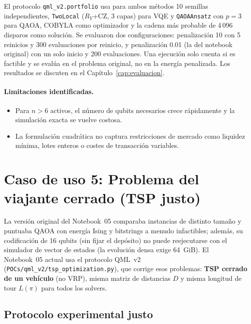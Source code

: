 El protocolo \texttt{qml\_v2.portfolio} usa para ambos métodos 10 semillas independientes, \texttt{TwoLocal} ($R_Y$+CZ, 3 capas) para VQE y \texttt{QAOAAnsatz} con $p=3$ para QAOA, COBYLA como optimizador y la cadena más probable de 4\,096 disparos como solución. Se evaluaron dos configuraciones: penalización 10 con 5 reinicios y 300 evaluaciones por reinicio, y penalización 0.01 (la del notebook original) con un solo inicio y 200 evaluaciones. Una ejecución solo cuenta si es factible y se evalúa en el problema original, no en la energía penalizada. Los resultados se discuten en el Capítulo~\ref{cap:evaluacion}.

\paragraph{Limitaciones identificadas.}
\begin{itemize}
  \item Para $n > 6$ activos, el número de qubits necesarios crece rápidamente y la simulación exacta se vuelve costosa.
  \item La formulación cuadrática no captura restricciones de mercado como liquidez mínima, lotes enteros o costes de transacción variables.
\end{itemize}

\section{Caso de uso 5: Problema del viajante cerrado (TSP justo)}
\label{sec:caso5_tsp}

La versión original del Notebook~05 comparaba instancias de distinto tamaño y puntuaba QAOA con energía Ising y bitstrings a menudo infactibles; además, su codificación de 16 qubits (sin fijar el depósito) no puede reejecutarse con el simulador de vector de estados (la evolución densa exige 64~GiB). El Notebook~05 actual usa el protocolo QML~v2 (\texttt{POCs/qml\_v2/tsp\_optimization.py}), que corrige esos problemas: \textbf{TSP cerrado de un vehículo} (no VRP), misma matriz de distancias $D$ y misma longitud de tour $L(\pi)$ para todos los solvers.

\subsection{Protocolo experimental justo}

